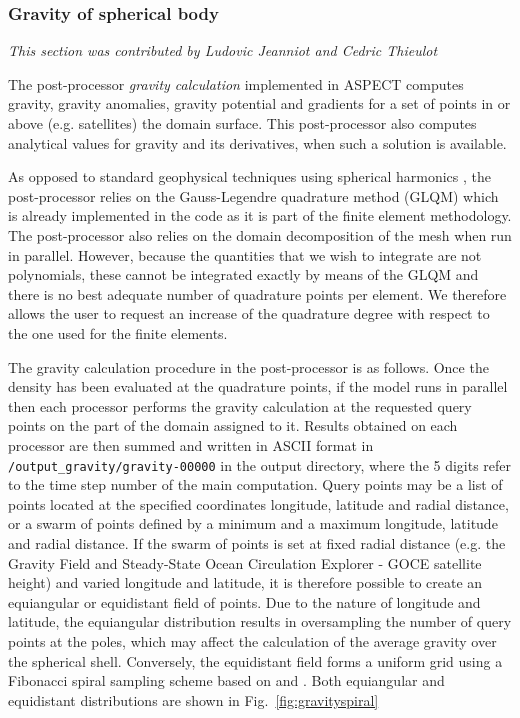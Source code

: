 \subsubsection{Gravity of spherical body}
\label{sec:benchmark_gravity_prem}

\textit{This section was contributed by Ludovic Jeanniot and Cedric Thieulot}

The post-processor \textit{gravity calculation} implemented in ASPECT computes gravity, gravity anomalies, gravity potential and gradients for a set of points in or above (e.g. satellites) the domain surface. This post-processor also computes  analytical values for gravity and its derivatives, when such a solution is available.

As opposed to standard geophysical techniques using spherical harmonics
\cite{sjoberg2017gravity}, the post-processor relies on the Gauss-Legendre quadrature method (GLQM) which is already implemented in the code 
as it is part of the finite element methodology. The post-processor also relies on the domain decomposition of the mesh when run in parallel. 
However, because the quantities that we wish to integrate are not polynomials, these cannot be integrated exactly by means of the GLQM and there is no best adequate number of quadrature points per element. We therefore allows the user to request an increase of the quadrature degree with respect to the one used for the finite elements.

The gravity calculation procedure in the post-processor is as follows. Once the density has been evaluated at the quadrature points, if the model runs in parallel then each processor performs the gravity calculation at the requested query points on the part of the domain assigned to it.
Results obtained on each processor are then summed and written in ASCII format in \texttt{/output\_gravity/gravity-00000} in the output directory, where the 5 digits refer to the time step number of the main computation.
Query points may be a list of points located at the specified coordinates longitude, latitude and radial distance, or a swarm of points defined by a minimum and a maximum longitude, latitude and radial distance. If the swarm of points is set at fixed radial distance (e.g. the Gravity Field and Steady-State Ocean Circulation Explorer - GOCE satellite height) and varied longitude and latitude, it is therefore possible to create an equiangular or equidistant field of points. Due to the nature of longitude and latitude, the equiangular distribution results in oversampling the number of query points at the poles, which may affect the calculation of the average gravity over the spherical shell. Conversely, the equidistant field forms a uniform grid using a Fibonacci spiral sampling scheme based on \cite{gonzalez2010measurement} and \cite{carlson2011made}. Both equiangular and equidistant distributions are shown in Fig.~\ref{fig:gravityspiral} 

